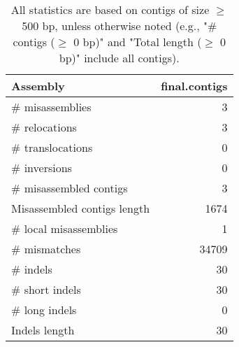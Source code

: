 \documentclass[12pt,a4paper]{article}
\begin{document}
\begin{table}[ht]
\begin{center}
\caption{All statistics are based on contigs of size $\geq$ 500 bp, unless otherwise noted (e.g., "\# contigs ($\geq$ 0 bp)" and "Total length ($\geq$ 0 bp)" include all contigs).}
\begin{tabular}{|l*{1}{|r}|}
\hline
Assembly & final.contigs \\ \hline
\# misassemblies & 3 \\ \hline
\hspace{5mm}\# relocations & 3 \\ \hline
\hspace{5mm}\# translocations & 0 \\ \hline
\hspace{5mm}\# inversions & 0 \\ \hline
\# misassembled contigs & 3 \\ \hline
Misassembled contigs length & 1674 \\ \hline
\# local misassemblies & 1 \\ \hline
\# mismatches & 34709 \\ \hline
\# indels & 30 \\ \hline
\hspace{5mm}\# short indels & 30 \\ \hline
\hspace{5mm}\# long indels & 0 \\ \hline
Indels length & 30 \\ \hline
\end{tabular}
\end{center}
\end{table}
\end{document}
